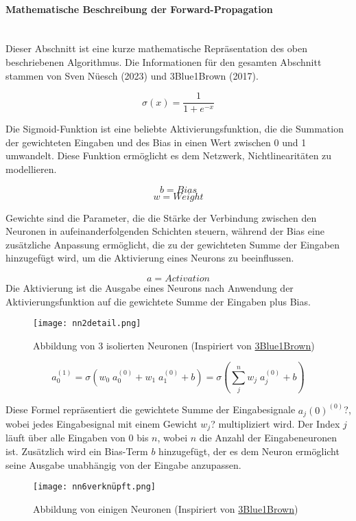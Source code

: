 \paragraph{Mathematische Beschreibung der Forward-Propagation}
\label{sec:forward_propagation_math}
\mbox{}\\\noindent Dieser Abschnitt ist eine kurze mathematische Repräsentation des oben beschriebenen Algorithmus. Die Informationen für den gesamten Abschnitt stammen von Sven Nüesch (2023) und 3Blue1Brown (2017).

\[\sigma(x)=\frac{1}{1+e^{-x}}\]

\noindent Die Sigmoid-Funktion ist eine beliebte Aktivierungsfunktion, die die Summation der gewichteten Eingaben und des Bias in einen Wert zwischen 0 und 1 umwandelt. Diese Funktion ermöglicht es dem Netzwerk, Nichtlinearitäten zu modellieren.

\[b=Bias\]
\[w=Weight\]

\noindent Gewichte sind die Parameter, die die Stärke der Verbindung zwischen den Neuronen in aufeinanderfolgenden Schichten steuern, während der Bias eine zusätzliche Anpassung ermöglicht, die zu der gewichteten Summe der Eingaben hinzugefügt wird, um die Aktivierung eines Neurons zu beeinflussen.

\[a=Activation\]
Die Aktivierung ist die Ausgabe eines Neurons nach Anwendung der Aktivierungsfunktion auf die gewichtete Summe der Eingaben plus Bias.

\begin{figure}[H]
	\centering
		\texttt{[image: nn2detail.png]}
	\label{fig:nn2detail}
	\caption{Abbildung von 3 isolierten Neuronen (Inspiriert von \href{https://www.youtube.com/watch?v=aircAruvnKk}{3Blue1Brown})}
\end{figure}

\[a_{0}^{(1)} = \sigma(w_{0}\; a_{0}^{(0)} + w_{1}\; a_{1}^{(0)} + b) = \sigma(\sum_{j}^{n} w_{j}\;a_{j} ^{(0)} + b)\]

\noindent Diese Formel repräsentiert die gewichtete Summe der Eingabesignale $a_j(0)^(0)$?, wobei jedes Eingabesignal mit einem Gewicht $w_j$? multipliziert wird. Der Index $j$ läuft über alle Eingaben von 0 bis $n$, wobei $n$ die Anzahl der Eingabeneuronen ist. Zusätzlich wird ein Bias-Term $b$ hinzugefügt, der es dem Neuron ermöglicht seine Ausgabe unabhängig von der Eingabe anzupassen.

\begin{figure}[H]
	\centering
		\texttt{[image: nn6verknüpft.png]}
	\label{fig:nn6verknüpft}
	\caption{Abbildung von einigen Neuronen (Inspiriert von \href{https://www.youtube.com/watch?v=aircAruvnKk}{3Blue1Brown})}
\end{figure}

